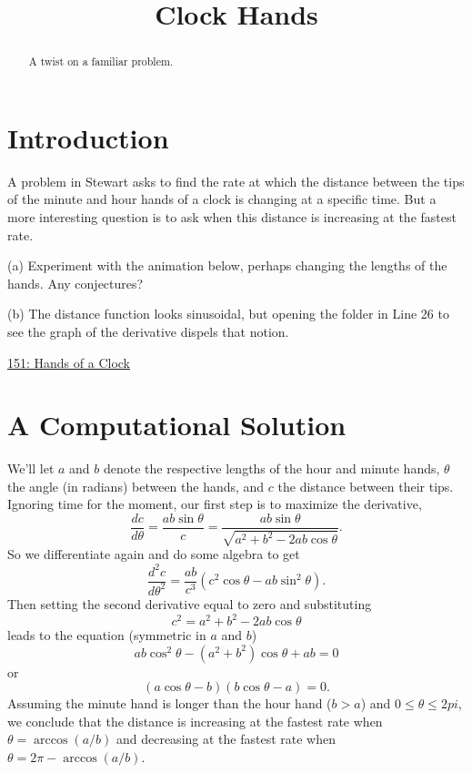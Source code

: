 \documentclass{ximera}
\title{Clock Hands}
\begin{document}
\begin{abstract}
A twist on a familiar problem.
\end{abstract}
\maketitle

\section*{Introduction}
A problem in Stewart asks to find the rate at which the distance between the tips of the minute and hour hands of a clock is changing at a specific time. But a more interesting question is to ask when this distance is increasing at the fastest rate. 


\begin{exploration}
(a) Experiment with the animation below, perhaps changing the lengths of the hands. Any conjectures?

(b) The distance function looks sinusoidal, but opening the folder in Line 26 to see the graph of the derivative dispels that notion. 

\begin{onlineOnly}
    \begin{center}
\end{center}
\end{onlineOnly}

\href{https://www.desmos.com/calculator/qr4d0ayurs}{151: Hands of a Clock}


\end{exploration}

\section*{A Computational Solution}

We'll let $a$ and $b$ denote the respective lengths of the hour and minute hands, $\theta$ the angle (in radians) between the hands, and $c$ the distance between their tips. Ignoring time for the moment, our first step is to maximize the derivative,
\[
        \frac{dc}{d\theta} = \frac{ab\sin \theta}{c} = \frac{ab \sin \theta}{\sqrt{a^2+b^2-2ab\cos\theta}}.
\]
So we differentiate again and do some algebra to get
\[
       \frac{d^2c}{d\theta^2} = \frac{ab}{c^3} \left( c^2\cos\theta - ab\sin^2\theta  \right).
\]
Then setting the second derivative equal to zero and substituting 
\[
      c^2 = a^2+b^2-2ab\cos\theta
\]
leads to the equation (symmetric in $a$ and $b$)
\[
     ab \cos^2\theta - (a^2 + b^2)\cos\theta + ab = 0
\]
or
\[
              (a \cos \theta - b) (b \cos \theta - a) = 0 .
\]
Assuming the minute hand is longer than the hour hand ($b>a$) and $0\leq \theta \leq 2pi$, we conclude that the distance is increasing at the fastest rate when $\theta = \arccos(a/b)$ and decreasing at the fastest rate when $\theta  = 2\pi - \arccos(a/b)$.
\end{document}
